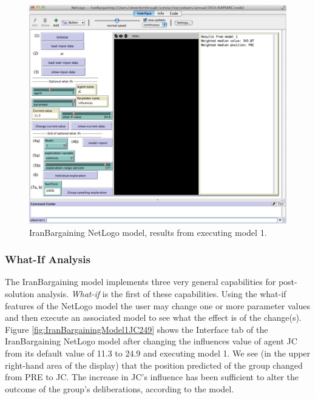\begin{figure}[htbp] %
   \centering
   \includegraphics[width=\textwidth]{chapters/gdp/figures/IranBargainingModel1.pdf} 
   \caption{IranBargaining NetLogo model, results from executing model 1.}
   \label{fig:IranBargainingModel1}
\end{figure}



%

\subsubsection{What-If Analysis}

The IranBargaining model implements three very general capabilities for post-solution analysis. \emph{What-if} is the first of these capabilities. Using the what-if features of the NetLogo model the user may change one or more parameter values and then execute an associated model to see what the effect is of the change(s).  Figure \ref{fig:IranBargainingModel1JC249} shows the Interface tab of the IranBargaining NetLogo model after changing the influences value of agent JC from its default value of 11.3 to 24.9 and executing model 1. We see (in the upper right-hand area of the display) that the position predicted of the group changed from PRE to JC. The increase in JC's influence has been sufficient to alter the outcome of the group's deliberations, according to the model.

